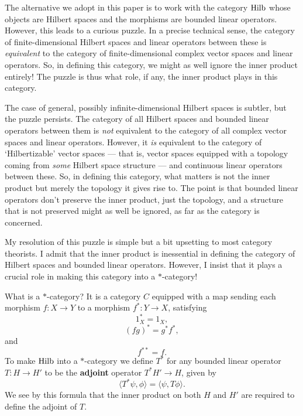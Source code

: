 \documentclass[12pt]{article}
\newcommand{\Hilb}{{\rm Hilb}}
\renewcommand{\to}{\rightarrow}
\newcommand{\maps}{\colon}
\begin{document}
The alternative we adopt in this paper is to work with the category
$\Hilb$ whose objects are Hilbert spaces and the morphisms are bounded
linear operators.  However, this leads to a curious puzzle.  In a 
precise technical sense, the category of finite-dimensional Hilbert 
spaces and linear operators between these is {\it equivalent} to the 
category of finite-dimensional complex vector spaces and linear operators.  
So, in defining this category, we might as well ignore the inner product
entirely!  The puzzle is thus what role, if any, the inner product
plays in this category.

The case of general, possibly infinite-dimensional Hilbert spaces
is subtler, but the puzzle persists.  The category of all Hilbert
spaces and bounded linear operators between them is {\it not}
equivalent to the category of all complex vector spaces and linear
operators.  However, it {\it is} equivalent to the category 
of `Hilbertizable' vector spaces --- that is, vector spaces equipped
with a topology coming from {\it some} Hilbert space structure ---
and continuous linear operators between these.  So, in defining
this category, what matters is not the inner product but merely
the topology it gives rise to.  The point is that bounded linear operators
don't preserve the inner product, just the topology, and a structure
that is not preserved might as well be ignored, as far as the category
is concerned.

My resolution of this puzzle is simple but a bit upsetting to
most category theorists.  I admit that the inner product is inessential
in defining the category of Hilbert spaces and bounded linear
operators.  However, I insist that it plays a crucial role in making 
this category into a $\ast$-category!

What is a $\ast$-category?  It is a category $C$
equipped with a map sending each morphism $f \maps X \to Y$ to
a morphism $f^\ast \maps Y \to X$, satisfying
\[             1_X^\ast = 1_X ,\]
\[            (fg)^\ast = g^\ast f^\ast, \]
and 
\[          f^{\ast\ast} = f. \]
To make $\Hilb$ into a $\ast$-category we
define $T^\ast$ for any bounded linear operator $T \maps H \to H'$
to be the {\bf adjoint} operator $T^\ast H' \to H$, given
by 
\[   \langle T^\ast \psi,\phi \rangle = \langle \psi, T\phi \rangle .\]
We see by this formula that the inner product on both $H$ and $H'$
are required to define the adjoint of $T$.
\end{document}
